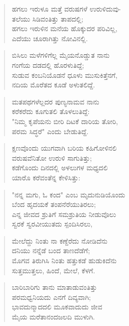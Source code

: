 \begin{verse}
ಹಗಲು ಇರುಳೂ ಮತ್ತೆ ವರುಷಗಳೆ ಉರುಳಿದುವು-\\ತಲೆಯು ಸಿಡಿವಂತಿತ್ತು ತಾಪದಲ್ಲಿ; \\ಹಗಲು ಇರುಳಿನ ಮನೆಯ ಹೊಕ್ಕುದರ ಪರಿವಿಲ್ಲ,\\ಎದೆಯು ಚೂರಾಗಿತ್ತು ನೋವಿನಲ್ಲಿ.
\end{verse}

\begin{verse}
ಬಿಸಿಲು ಮಳೆಗಳಿಗೆಲ್ಲ ಮೈಯನೊಡ್ಡುತ ನಾನು\\ಗಂಗೆಯ ದಡದಲ್ಲಿ ಹೊರಳುತಿದ್ದೆ;\\ಸುಡುವ ಕಂಬನಿಯೊಡನೆ ಧೂಳು ಮುಸುಕಿತ್ತೆನಗೆ,\\ನದಿಯ ಮೊರೆತದ ಕೂಡೆ ಅಳುತಲಿದ್ದೆ.
\end{verse}

\begin{verse}
ಮತಪಥಗಳೆಲ್ಲದರ ಪುಣ್ಯನಾಮವ ನಾನು\\ಕರೆಕರೆದು ಕೂಗುತಲಿ ತೊಳಲುತಿದ್ದೆ:\\"ನಿಮ್ಮ ಕೃಪೆಯನು ಬೀರಿ ದಿಟಕೆ ದಾರಿಯ ತೋರಿ,\\ಪರಮ ಸಿದ್ಧರೆ" ಎಂದು ಬೇಡುತಿದ್ದೆ. 
\end{verse}

\begin{verse}
ಕ್ಷಣವೊಂದು ಯುಗವಾಗಿ ಬರಿಯ ಕಹಿಗೋಳಿನಲಿ\\ವರುಷವೆನಿತೋ ಉರುಳಿ ಸಾಗುತಿತ್ತು;\\ಕಡೆಗೊಂದು ದಿನದಲ್ಲಿ ಅಳಲುಗಳ ಮಧ್ಯದಲಿ\\ಯಾರೊ ಕರೆವಂತೆನ್ನ ಕೇಳಿಸಿತ್ತು:
\end{verse}

\begin{verse}
"ನನ್ನ ಮಗು, ಓ ಕಂದ" ಎಂಬ ಮೃದುನುಡಿಯೊಂದು\\ಬೆಂದ ಹೃದಯಕೆ ತಂಪನೆರೆಯುತಿರಲು;\\ಎನ್ನ ಜೀವದ ಶ್ರುತಿಗೆ ಸಮಶ್ರುತಿಯ ನೀಡುವೊಲು\\ಸ್ವರಕೆ ಸ್ವರವೀಯುತದು ಸ್ಪಂದಿಸಿರಲು,
\end{verse}

\begin{verse}
ಮೇಲೆದ್ದು ನಿಂತು ನಾ ಕಣ್ದೆರೆದು ನೋಡಿದೆನು\\ದನಿಯು ನನ್ನೆಡೆ ಬಂದ ತಾಣದೆಡೆಗೆ; \\ಮೊಗವ ತಿರುಗಿಸಿ ನಿಂತು ಹತ್ತುಕಡೆ ಹುಡುಕಿದೆನು\\ಸುತ್ತಮುತ್ತಲು, ಹಿಂದೆ, ಮೇಲೆ, ಕೆಳಗೆ.
\end{verse}

\begin{verse}
ಬಾರಿಬಾರಿಗು ತಾನು ಮಾತಾಡುವಂತಿತ್ತು\\ಪರಮಧ್ವನಿಯದು ಎನಗೆ ದಿವ್ಯವಾಗಿ;\\ಭಾವದುನ್ಮಾದದಲಿ ಮೂಕವಾದುದು ಜೀವ\\ಮೈಯ ಮರೆತಾನಂದಜಲದಿ ಮುಳುಗಿ.
\end{verse}

